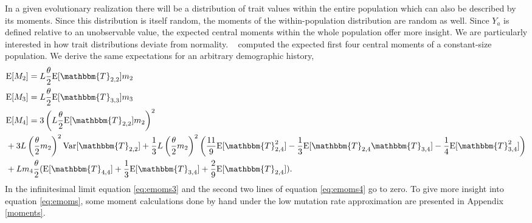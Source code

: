 In a given evolutionary realization there will be a distribution of trait values
within the entire population which can also be described by its moments. Since
this distribution is itself random, the moments of the within-population
distribution are random as well. Since $Y_a$ is defined relative to an
unobservable value, the expected central moments within the whole population
offer more insight. We are particularly interested in how trait distributions
deviate from normality. ~\citet{Schraiber2015} computed the expected first four
central moments of a constant-size population. We derive the same expectations
for an arbitrary demographic history,
\begin{subequations} \label{eq:emoms}
\begin{align}
  &\E[M_2] = L \T \E[\mathbbm{T}_{2,2}] m_2 \label{eq:emoms2}\\
  &\E[M_3] = L \T \E[\mathbbm{T}_{3,3}] m_3  \label{eq:emoms3}\\
  &\E[M_4] = 3\left(L \T \E[\mathbbm{T}_{2,2}] m_2\right)^2 \nonumber \\
  &+ 3L \left(\T m_2\right)^2\Var[\mathbbm{T}_{2,2}] + \frac{1}{3}
  L \left(\T m_2\right)^2
    \left( \frac{11}{9} \E[\mathbbm{T}_{2,4}^2]-\frac{1}{3}\E[\mathbbm{T}_{2,4}\mathbbm{T}_{3,4}]-
    \frac{1}{4}\E[\mathbbm{T}_{3,4}^2]\right) \nonumber \\
  &+ L m_4 \T ( \E[\mathbbm{T}_{4,4}] + \frac{1}{3} \E[\mathbbm{T}_{3,4}] +
    \frac{2}{9} \E[\mathbbm{T}_{2,4}] ).
  \label{eq:emoms4}
\end{align}
\end{subequations}
In the infinitesimal limit equation \eqref{eq:emoms3} and the second two lines
of equation \eqref{eq:emoms4} go to zero. To give more insight into equation
\eqref{eq:emoms}, some moment calculations done by hand under the low mutation rate
approximation are presented in Appendix \ref{moments}.

